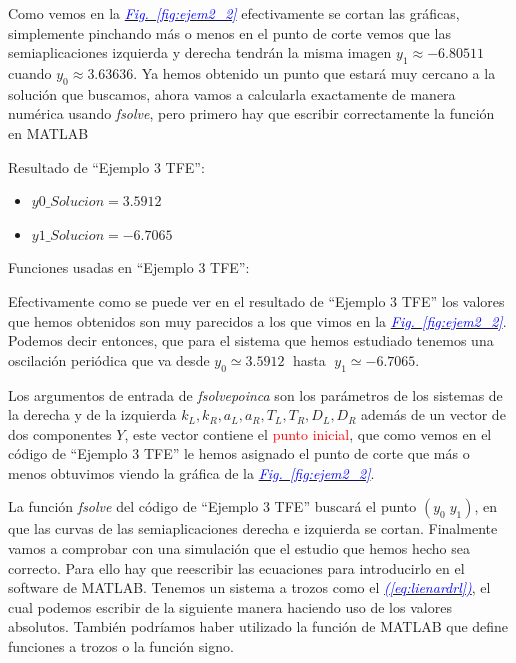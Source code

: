 \documentclass[12pt,a4paper]{report} %
\newcommand{\fref}[1]{\hyperref[#1]{\textcolor{blue}{\textit{Fig.~\ref*{#1}}}}}
\newcommand{\eref}[1]{\hyperref[#1]{\textcolor{blue}{\textit{(\ref*{#1})}}}}
\begin{document}
	Como vemos en la \fref{fig:ejem2_2} efectivamente se cortan las gráficas, simplemente pinchando más o menos en el punto de corte vemos que las semiaplicaciones izquierda y derecha tendrán la misma imagen $y_1\approx-6.80511$ cuando $y_0\approx3.63636$.
	\newpage
	Ya hemos obtenido un punto que estará muy cercano a la solución que buscamos, ahora vamos a calcularla exactamente de manera numérica usando \textit{fsolve}, pero primero hay que escribir correctamente la función en MATLAB
	
		
	\vspace{1cm}
	
	\vspace{0.5cm}\noindent Resultado de ``Ejemplo 3 TFE'':
	\begin{itemize}
		\item $y0\_Solucion=3.5912$
		\item $y1\_Solucion=-6.7065$
	\end{itemize}
	
	\vspace{1cm}\noindent Funciones usadas en ``Ejemplo 3 TFE'':
	\vspace{0.5cm}
	\vspace{0.5cm}
	\newpage
	
	Efectivamente como se puede ver en el resultado de ``Ejemplo 3 TFE'' los valores que hemos obtenidos son muy parecidos a los que vimos en la \fref{fig:ejem2_2}. Podemos decir entonces, que para el sistema que hemos estudiado tenemos una oscilación periódica que va desde $y_0\simeq3.5912\;$ hasta $\; y_1\simeq-6.7065$.

	
	\vspace{0.5cm}Los argumentos de entrada de \textit{fsolvepoinca} son los parámetros de los sistemas de la derecha y de la izquierda $k_L,k_R,a_L,a_R,T_L,T_R,D_L,D_R$ además de un vector de dos componentes $Y$, este vector contiene el \textcolor{red}{punto inicial}, que como vemos en el código de ``Ejemplo 3 TFE'' le hemos asignado el punto de corte que más o menos obtuvimos viendo la gráfica de la \fref{fig:ejem2_2}.
	
	
	\vspace{0.5cm}La función \textit{fsolve} del código de ``Ejemplo 3 TFE'' buscará el punto $\left(y_0\; y_1\right)$, en que las curvas de las semiaplicaciones derecha e izquierda se cortan.
	\newpage
	Finalmente vamos a comprobar con una simulación que el estudio que hemos hecho sea correcto. Para ello hay que reescribir las ecuaciones para introducirlo en el software de MATLAB. Tenemos un sistema a trozos como el \eref{eq:lienardrl}, el cual podemos escribir de la siguiente manera haciendo uso de los valores absolutos. También podríamos haber utilizado la función de MATLAB que define funciones a trozos o la función signo.
	
\end{document}
